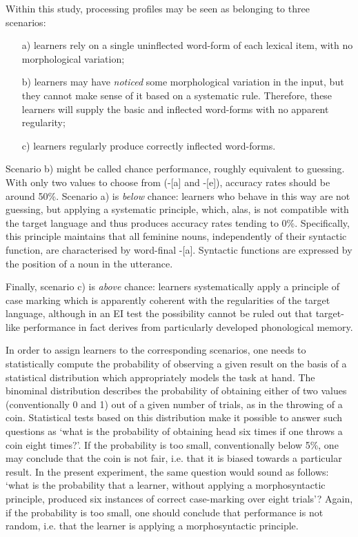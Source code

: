 Within this study, processing profiles may be seen as belonging to three scenarios: 

\begin{itemize}
    \item[a)] learners rely on a single uninflected word-form of each lexical item, with no morphological variation;
    \item[b)] learners may have \textit{noticed} some morphological variation in the input, but they cannot make sense of it based on a systematic rule. Therefore, these learners will supply the basic and inflected word-forms with no apparent regularity;
    \item[c)] learners regularly produce correctly inflected word-forms.
\end{itemize}

Scenario b) might be called chance performance, roughly equivalent to guessing. With only two values to choose from (-[a] and -[e]), accuracy rates should be around 50\%. Scenario a) is \textit{below} chance: learners who behave in this way are not guessing, but applying a systematic principle, which, alas, is not compatible with the target language and thus produces accuracy rates tending to 0\%. Specifically, this principle maintains that all feminine nouns, independently of their syntactic function, are characterised by word-final -[a]. Syntactic functions are expressed by the position of a noun in the utterance.

Finally, scenario c) is \textit{above} chance: learners systematically apply a principle of case marking which is apparently coherent with the regularities of the target language, although in an EI test the possibility cannot be ruled out that target-like performance in fact derives from particularly developed phonological memory.

In order to assign learners to the corresponding scenarios, one needs to statistically compute the probability of observing a given result on the basis of a statistical distribution which appropriately models the task at hand. The binominal distribution describes the probability of obtaining either of two values (conventionally 0 and 1) out of a given number of trials, as in the throwing of a coin. Statistical tests based on this distribution make it possible to answer such questions as ‘what is the probability of obtaining head six times if one throws a coin eight times?’. If the probability is too small, conventionally below 5\%, one may conclude that the coin is not fair, i.e. that it is biased towards a particular result. In the present experiment, the same question would sound as follows: ‘what is the probability that a learner, without applying a morphosyntactic principle, produced six instances of correct case-marking over eight trials’? Again, if the probability is too small, one should conclude that performance is not random, i.e. that the learner is applying a morphosyntactic principle. 


